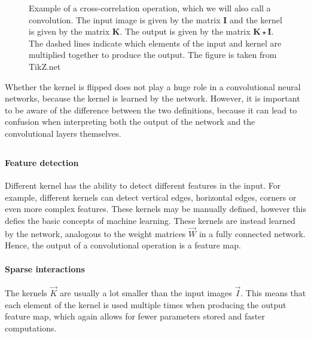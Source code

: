         \begin{figure}[h!]
            \centering
            
            \caption{ Example of a cross-correlation operation, which we will also call a convolution. The input image is given by the matrix $\mathbf I$ and the kernel is given by the matrix $\mathbf K$. The output is given by the matrix $\mathbf{K \star I}$. The dashed lines indicate which elements of the input and kernel are multiplied together to produce the output. The figure is taken from TikZ.net }
            \label{fig:ML:CNN:convolution:convolution_operation_map_example}
        \end{figure}
        Whether the kernel is flipped does not play a huge role in a convolutional neural networks, because the kernel is learned by the network. However, it is important to be aware of the difference between the two definitions, because it can lead to confusion when interpreting both the output of the network and the convolutional layers themselves. 

    \subsection{}
        \paragraph{Feature detection}
            Different kernel has the ability to detect different features in the input. For example, different kernels can detect vertical edges, horizontal edges, corners or even more complex features. These kernels may be manually defined, however this defies the basic concepts of machine learning. These kernels are instead learned by the network, analogous to the weight matrices $\vec{W}$ in a fully connected network. Hence, the output of a convolutional operation is a feature map. 

        \paragraph{Sparse interactions}
            The kernels $\vec{K}$ are usually a lot smaller than the input images $\vec{I}$. This means that each element of the kernel is used multiple times when producing the output feature map, which again allows for fewer parameters stored and faster computations. 


